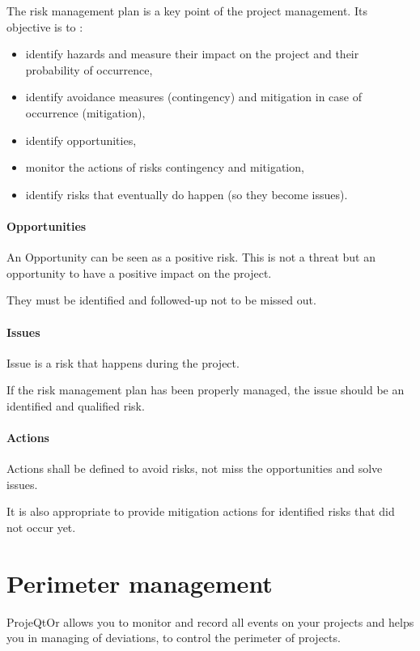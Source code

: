 \documentclass[letterpaper,10pt,english]{sphinxmanual}
\begin{document}
The risk management plan is a key point of the project management. Its objective is to :
\begin{itemize}
\item {} 
identify hazards and measure their impact on the project and their probability of occurrence,

\item {} 
identify avoidance measures (contingency) and mitigation in case of occurrence (mitigation),

\item {} 
identify opportunities,

\item {} 
monitor the actions of risks contingency and mitigation,

\item {} 
identify risks that eventually do happen (so they become issues).

\end{itemize}

\paragraph{Opportunities}

An Opportunity can be seen as a positive risk. This is not a threat but an opportunity to have a positive impact on the project.

They must be identified and followed-up not to be missed out.

\paragraph{Issues}

Issue is a risk that happens during the project.

If the risk management plan has been properly managed, the issue should be an identified and qualified risk.

\paragraph{Actions}

Actions shall be defined to avoid risks, not miss the opportunities and solve issues.

It is also appropriate to provide mitigation actions for identified risks that did not occur yet.
\newpage
{}

\section{Perimeter management}
\label{Features:index-36}\label{Features:perimeter-management}
ProjeQtOr  allows you to monitor and record all events on your projects and helps you in managing of deviations, to control the perimeter of projects.
\end{document}
